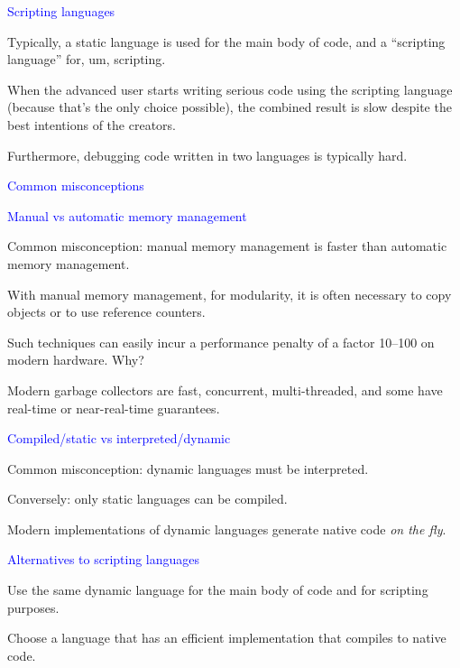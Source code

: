\documentclass{slides}
\newcommand{\ti}[1]{\begin{center}\Large{\textcolor{blue}{#1}}\end{center}}
\begin{document}
\begin{slide}\ti{Scripting languages}

Typically, a static language is used for the main body of code, and a
``scripting language'' for, um, scripting.

When the advanced user starts writing serious code using the scripting
language (because that's the only choice possible), the combined
result is slow despite the best intentions of the creators.

Furthermore, debugging code written in two languages is typically hard.

\vfill\end{slide}
\begin{slide}\ti{Common misconceptions}

\vfill\end{slide}
\begin{slide}\ti{Manual vs automatic memory management}

Common misconception: manual memory management is faster than
automatic memory management.

With manual memory management, for modularity, it is often necessary
to copy objects or to use reference counters.

Such techniques can easily incur a performance penalty of a factor
10--100 on modern hardware.  Why?

Modern garbage collectors are fast, concurrent, multi-threaded, and
some have real-time or near-real-time guarantees.

\vfill\end{slide}
\begin{slide}\ti{Compiled/static vs interpreted/dynamic}

Common misconception: dynamic languages must be interpreted.

Conversely: only static languages can be compiled.

Modern implementations of dynamic languages generate native code
\emph{on the fly}.

\vfill\end{slide}
\begin{slide}\ti{Alternatives to scripting languages}

Use the same dynamic language for the main body of code and for
scripting purposes.

Choose a language that has an efficient implementation that compiles
to native code.

\vfill\end{slide}
\end{document}
